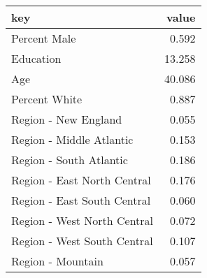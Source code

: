 \begin{tabular}{lr}
  \hline
key & value \\ 
  \hline
Percent Male & 0.592 \\ 
  Education & 13.258 \\ 
  Age & 40.086 \\ 
  Percent White & 0.887 \\ 
  Region - New England & 0.055 \\ 
  Region - Middle Atlantic & 0.153 \\ 
  Region - South Atlantic & 0.186 \\ 
  Region - East North Central & 0.176 \\ 
  Region - East South Central & 0.060 \\ 
  Region - West North Central & 0.072 \\ 
  Region - West South Central & 0.107 \\ 
  Region - Mountain & 0.057 \\ 
   \hline
\end{tabular}
